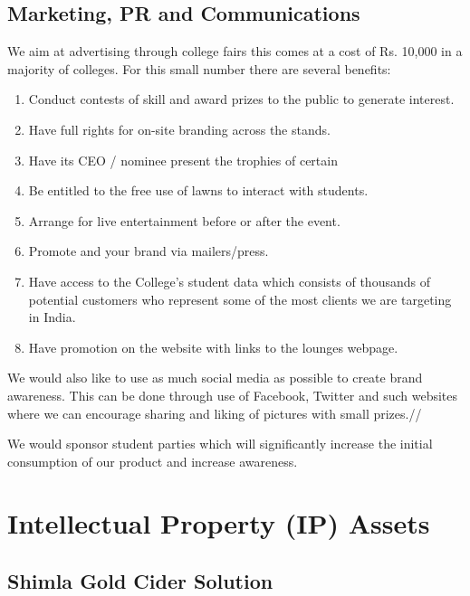 \documentclass[11pt]{article}
\begin{document}
  \subsection{Marketing, PR and Communications}
We aim at advertising through college fairs this comes at a cost of Rs. 10,000 in a majority of colleges. For this small number there are several benefits:
\begin{enumerate}
\item Conduct contests of skill and award prizes to the public to generate interest.
\item Have full rights for on-site branding across the stands.
\item Have its CEO / nominee present the trophies of certain
\item Be entitled to the free use of lawns to interact with students.
\item Arrange for live entertainment before or after the event.
\item Promote and your brand via mailers/press.
\item Have access to the College's student data which consists of thousands of potential customers who represent some of the most clients we are targeting in India.
\item Have promotion on the website with links to the lounges webpage.
\end{enumerate}

We would also like to use as much social media as possible to create brand awareness. This can be done through use of Facebook, Twitter and such websites where we can encourage sharing and liking  of pictures with small prizes.//

We would sponsor student parties which will significantly increase the initial consumption of our product and increase awareness.

\newpage
\section{Intellectual Property (IP) Assets}
  \subsection{Shimla Gold Cider Solution}
\end{document}
